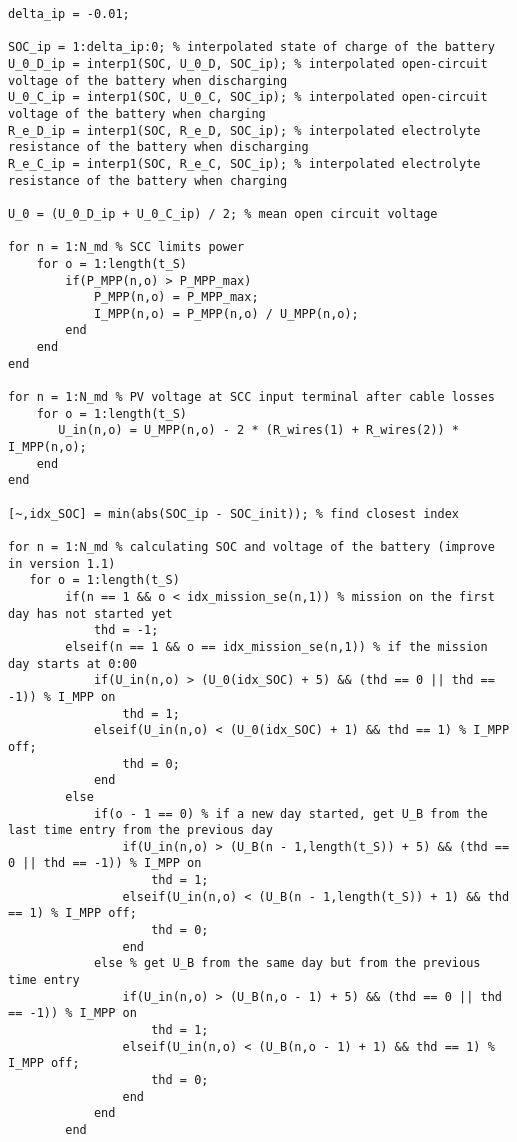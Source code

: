 \begin{lstlisting}
delta_ip = -0.01;

SOC_ip = 1:delta_ip:0; % interpolated state of charge of the battery
U_0_D_ip = interp1(SOC, U_0_D, SOC_ip); % interpolated open-circuit voltage of the battery when discharging
U_0_C_ip = interp1(SOC, U_0_C, SOC_ip); % interpolated open-circuit voltage of the battery when charging
R_e_D_ip = interp1(SOC, R_e_D, SOC_ip); % interpolated electrolyte resistance of the battery when discharging
R_e_C_ip = interp1(SOC, R_e_C, SOC_ip); % interpolated electrolyte resistance of the battery when charging

U_0 = (U_0_D_ip + U_0_C_ip) / 2; % mean open circuit voltage

for n = 1:N_md % SCC limits power
    for o = 1:length(t_S)
        if(P_MPP(n,o) > P_MPP_max)
            P_MPP(n,o) = P_MPP_max;
            I_MPP(n,o) = P_MPP(n,o) / U_MPP(n,o);
        end
    end
end

for n = 1:N_md % PV voltage at SCC input terminal after cable losses
    for o = 1:length(t_S)
       U_in(n,o) = U_MPP(n,o) - 2 * (R_wires(1) + R_wires(2)) * I_MPP(n,o);
    end
end

[~,idx_SOC] = min(abs(SOC_ip - SOC_init)); % find closest index

for n = 1:N_md % calculating SOC and voltage of the battery (improve in version 1.1)
   for o = 1:length(t_S)
        if(n == 1 && o < idx_mission_se(n,1)) % mission on the first day has not started yet 
            thd = -1;
        elseif(n == 1 && o == idx_mission_se(n,1)) % if the mission day starts at 0:00
            if(U_in(n,o) > (U_0(idx_SOC) + 5) && (thd == 0 || thd == -1)) % I_MPP on
                thd = 1;
            elseif(U_in(n,o) < (U_0(idx_SOC) + 1) && thd == 1) % I_MPP off;
                thd = 0;
            end
        else
            if(o - 1 == 0) % if a new day started, get U_B from the last time entry from the previous day
                if(U_in(n,o) > (U_B(n - 1,length(t_S)) + 5) && (thd == 0 || thd == -1)) % I_MPP on
                    thd = 1;
                elseif(U_in(n,o) < (U_B(n - 1,length(t_S)) + 1) && thd == 1) % I_MPP off;
                    thd = 0;
                end
            else % get U_B from the same day but from the previous time entry
                if(U_in(n,o) > (U_B(n,o - 1) + 5) && (thd == 0 || thd == -1)) % I_MPP on
                    thd = 1;
                elseif(U_in(n,o) < (U_B(n,o - 1) + 1) && thd == 1) % I_MPP off;
                    thd = 0;
                end
            end 
        end
        

\end{lstlisting}
